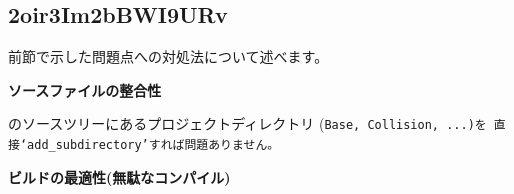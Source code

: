 \subsection{2oir3Im2bBWI9URv}
\label{subsec:Solution}

\noindent
\KLUDGE 前節で示した問題点への対処法について述べます。

\bigskip
\noindent
\bf{\KLUDGE ソースファイルの整合性}
\begin{narrow}[20pt]
	\SprLib \KLUDGE のソースツリーにあるプロジェクトディレクトリ
	(\tt{Base}, \tt{Collision}, ...)\KLUDGE を
	\KLUDGE 直接`\tt{add\_subdirectory}'\KLUDGE すれば問題ありません。
\end{narrow}

\medskip
\noindent
\bf{\KLUDGE ビルドの最適性(\KLUDGE 無駄なコンパイル)}
